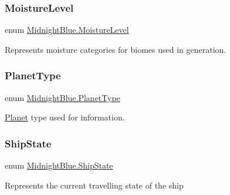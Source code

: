 \hypertarget{namespace_midnight_blue_a7428767e7fc0b52bab6cb270f8354e1d}{}\label{namespace_midnight_blue_a7428767e7fc0b52bab6cb270f8354e1d} 
\subsubsection{\texorpdfstring{Moisture\+Level}{MoistureLevel}}
{\footnotesize\ttfamily enum \hyperlink{namespace_midnight_blue_a7428767e7fc0b52bab6cb270f8354e1d}{Midnight\+Blue.\+Moisture\+Level}\hspace{0.3cm}{\ttfamily [strong]}}



Represents moisture categories for biomes used in generation. 

\hypertarget{namespace_midnight_blue_a4a799009a18b57979628708589ae53e3}{}\label{namespace_midnight_blue_a4a799009a18b57979628708589ae53e3} 
\subsubsection{\texorpdfstring{Planet\+Type}{PlanetType}}
{\footnotesize\ttfamily enum \hyperlink{namespace_midnight_blue_a4a799009a18b57979628708589ae53e3}{Midnight\+Blue.\+Planet\+Type}\hspace{0.3cm}{\ttfamily [strong]}}



\hyperlink{class_midnight_blue_1_1_planet}{Planet} type used for information. 

\hypertarget{namespace_midnight_blue_a46fd3250d826e0dec67892328d5b368c}{}\label{namespace_midnight_blue_a46fd3250d826e0dec67892328d5b368c} 
\subsubsection{\texorpdfstring{Ship\+State}{ShipState}}
{\footnotesize\ttfamily enum \hyperlink{namespace_midnight_blue_a46fd3250d826e0dec67892328d5b368c}{Midnight\+Blue.\+Ship\+State}\hspace{0.3cm}{\ttfamily [strong]}}



Represents the current travelling state of the ship 

